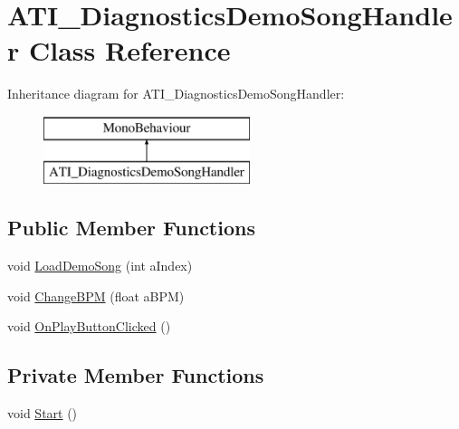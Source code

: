 \hypertarget{class_a_t_i___diagnostics_demo_song_handler}{}\section{A\+T\+I\+\_\+\+Diagnostics\+Demo\+Song\+Handler Class Reference}
\label{class_a_t_i___diagnostics_demo_song_handler}
Inheritance diagram for A\+T\+I\+\_\+\+Diagnostics\+Demo\+Song\+Handler\+:\begin{figure}[H]
\begin{center}
\leavevmode
\includegraphics[height=2.000000cm]{class_a_t_i___diagnostics_demo_song_handler}
\end{center}
\end{figure}
\subsection*{Public Member Functions}
\begin{DoxyCompactItemize}
\item 
void \hyperlink{class_a_t_i___diagnostics_demo_song_handler_aecc26edabf9f923007a18c38a6934a5c}{Load\+Demo\+Song} (int a\+Index)
\item 
void \hyperlink{class_a_t_i___diagnostics_demo_song_handler_a860f995ecf2cce11b2a9a3e8fe37237e}{Change\+B\+PM} (float a\+B\+PM)
\item 
void \hyperlink{class_a_t_i___diagnostics_demo_song_handler_acb03659027c98d419fc6ff61dbf24356}{On\+Play\+Button\+Clicked} ()
\end{DoxyCompactItemize}
\subsection*{Private Member Functions}
\begin{DoxyCompactItemize}
\item 
void \hyperlink{class_a_t_i___diagnostics_demo_song_handler_a86f25504d9704a3f330328c476f890c4}{Start} ()
\end{DoxyCompactItemize}
